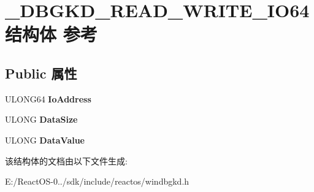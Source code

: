 \hypertarget{struct___d_b_g_k_d___r_e_a_d___w_r_i_t_e___i_o64}{}\section{\+\_\+\+D\+B\+G\+K\+D\+\_\+\+R\+E\+A\+D\+\_\+\+W\+R\+I\+T\+E\+\_\+\+I\+O64结构体 参考}
\label{struct___d_b_g_k_d___r_e_a_d___w_r_i_t_e___i_o64}
\subsection*{Public 属性}
\begin{DoxyCompactItemize}
\item 
\mbox{\label{struct___d_b_g_k_d___r_e_a_d___w_r_i_t_e___i_o64_a64dc4bd6df652160a82a60e07d2ac0e0}} 
U\+L\+O\+N\+G64 {\bfseries Io\+Address}
\item 
\mbox{\label{struct___d_b_g_k_d___r_e_a_d___w_r_i_t_e___i_o64_adb2b18278e448a38e16a2fc5273b084f}} 
U\+L\+O\+NG {\bfseries Data\+Size}
\item 
\mbox{\label{struct___d_b_g_k_d___r_e_a_d___w_r_i_t_e___i_o64_a5968cf8485f3d29f77fc8e275df507cf}} 
U\+L\+O\+NG {\bfseries Data\+Value}
\end{DoxyCompactItemize}


该结构体的文档由以下文件生成\+:\begin{DoxyCompactItemize}
\item 
E\+:/\+React\+O\+S-\/0../sdk/include/reactos/windbgkd.\+h\end{DoxyCompactItemize}
